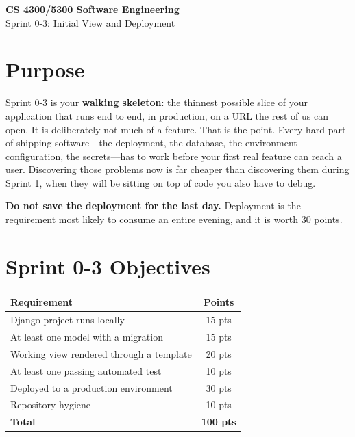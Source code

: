 \documentclass[11pt]{article}
\begin{document}
\begin{center}
{\LARGE\textbf{CS 4300/5300 Software Engineering}}\\[0.5em]
{\Large Sprint 0-3: Initial View and Deployment}\\[1em]
\end{center}

\section{Purpose}

Sprint 0-3 is your \textbf{walking skeleton}: the thinnest possible slice of your application that runs end to end, in production, on a URL the rest of us can open. It is deliberately not much of a feature. That is the point. Every hard part of shipping software---the deployment, the database, the environment configuration, the secrets---has to work before your first real feature can reach a user. Discovering those problems now is far cheaper than discovering them during Sprint 1, when they will be sitting on top of code you also have to debug. \newline

\noindent\textbf{Do not save the deployment for the last day.} Deployment is the requirement most likely to consume an entire evening, and it is worth 30 points.

\section{Sprint 0-3 Objectives}

\begin{center}
\begin{tabular}{lc}
\toprule
\textbf{Requirement} & \textbf{Points} \\
\midrule
Django project runs locally & 15 pts \\
At least one model with a migration & 15 pts \\
Working view rendered through a template & 20 pts \\
At least one passing automated test & 10 pts \\
Deployed to a production environment & 30 pts \\
Repository hygiene & 10 pts \\
\midrule
\textbf{Total} & \textbf{100 pts} \\
\bottomrule
\end{tabular}
\end{center}
\end{document}
